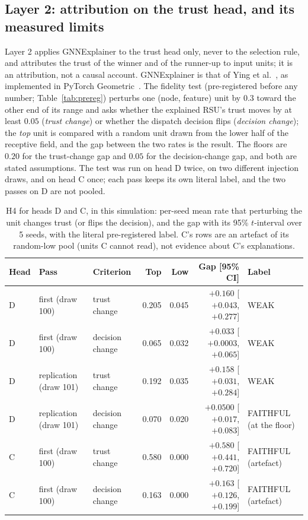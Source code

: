 \subsection{Layer 2: attribution on the trust head, and its measured limits}
\label{sec:layer2}
Layer 2 applies GNNExplainer to the trust head only, never to the selection rule, and attributes the trust of the winner and of the runner-up to input units; it is an attribution, not a causal account.
GNNExplainer is that of Ying et al.~\cite{ying}, as implemented in PyTorch Geometric~\cite{fey}.
The fidelity test (pre-registered before any number; Table~\ref{tab:prereg}) perturbs one (node, feature) unit by $0.3$ toward the other end of its range and asks whether the explained RSU's trust moves by at least $0.05$ (\emph{trust change}) or whether the dispatch decision flips (\emph{decision change}); the \emph{top} unit is compared with a random unit drawn from the lower half of the receptive field, and the gap between the two rates is the result.
The floors are $0.20$ for the trust-change gap and $0.05$ for the decision-change gap, and both are stated assumptions.
The test was run on head D twice, on two different injection draws, and on head C once; each pass keeps its own literal label, and the two passes on D are not pooled.

\begin{table}[t]
\centering
\caption{H4 for heads D and C, in this simulation: per-seed mean rate that perturbing the unit changes trust (or flips the decision), and the gap with its 95\% $t$-interval over 5 seeds, with the literal pre-registered label. C's rows are an artefact of its random-low pool (units C cannot read), not evidence about C's explanations.}
\label{tab:h4}
\small
\begin{tabular}{@{}lllrrrl@{}}
\toprule
Head & Pass & Criterion & Top & Low & Gap [95\% CI] & Label \\
\midrule
D & first (draw 100) & trust change & 0.205 & 0.045 & $+0.160$ [$+0.043$, $+0.277$] & WEAK \\
D & first (draw 100) & decision change & 0.065 & 0.032 & $+0.033$ [$+0.0003$, $+0.065$] & WEAK \\
D & replication (draw 101) & trust change & 0.192 & 0.035 & $+0.158$ [$+0.031$, $+0.284$] & WEAK \\
D & replication (draw 101) & decision change & 0.070 & 0.020 & $+0.0500$ [$+0.017$, $+0.083$] & FAITHFUL (at the floor) \\
C & first (draw 100) & trust change & 0.580 & 0.000 & $+0.580$ [$+0.441$, $+0.720$] & FAITHFUL (artefact) \\
C & first (draw 100) & decision change & 0.163 & 0.000 & $+0.163$ [$+0.126$, $+0.199$] & FAITHFUL (artefact) \\
\bottomrule
\end{tabular}
\end{table}

